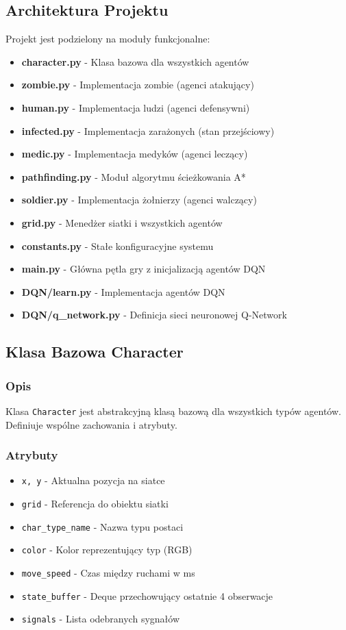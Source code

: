 \documentclass[12pt,a4paper]{article}
\begin{document}
\subsection{Architektura Projektu}

Projekt jest podzielony na moduły funkcjonalne:

\begin{itemize}
	\item \textbf{character.py} - Klasa bazowa dla wszystkich agentów
	\item \textbf{zombie.py} - Implementacja zombie (agenci atakujący)
	\item \textbf{human.py} - Implementacja ludzi (agenci defensywni)
	\item \textbf{infected.py} - Implementacja zarażonych (stan przejściowy)
	\item \textbf{medic.py} - Implementacja medyków (agenci leczący)
	\item \textbf{pathfinding.py} - Moduł algorytmu ścieżkowania A*
	\item \textbf{soldier.py} - Implementacja żołnierzy (agenci walczący)
	\item \textbf{grid.py} - Menedżer siatki i wszystkich agentów
	\item \textbf{constants.py} - Stałe konfiguracyjne systemu
	\item \textbf{main.py} - Główna pętla gry z inicjalizacją agentów DQN
	\item \textbf{DQN/learn.py} - Implementacja agentów DQN
	\item \textbf{DQN/q\_network.py} - Definicja sieci neuronowej Q-Network
\end{itemize}

\subsection{Klasa Bazowa Character}

\subsubsection{Opis}
Klasa \texttt{Character} jest abstrakcyjną klasą bazową dla wszystkich typów
agentów. Definiuje wspólne zachowania i atrybuty.

\subsubsection{Atrybuty}
\begin{itemize}
	\item \texttt{x, y} - Aktualna pozycja na siatce
	\item \texttt{grid} - Referencja do obiektu siatki
	\item \texttt{char\_type\_name} - Nazwa typu postaci
	\item \texttt{color} - Kolor reprezentujący typ (RGB)
	\item \texttt{move\_speed} - Czas między ruchami w ms
	\item \texttt{state\_buffer} - Deque przechowujący ostatnie 4 obserwacje
	\item \texttt{signals} - Lista odebranych sygnałów
\end{itemize}
\end{document}

